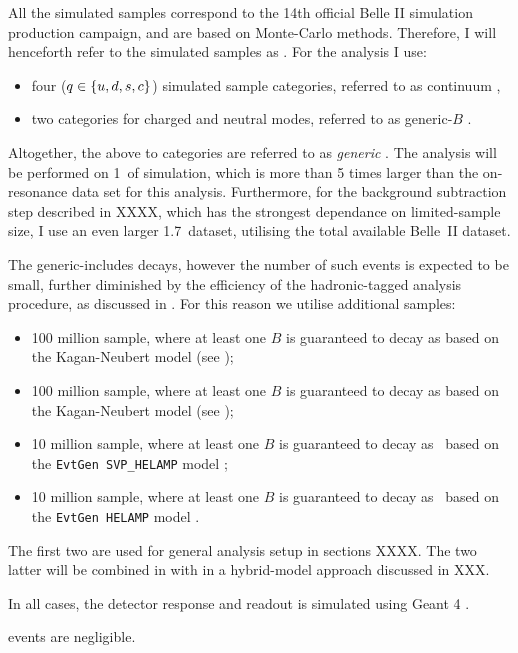 All the simulated samples correspond to the 14th official Belle II simulation production campaign, and are based on Monte-Carlo methods.
Therefore, I will henceforth refer to the simulated samples as \MC.
For the analysis I use:
\begin{itemize}
    \item four \epem\ra\qqbar ($q\in\{u,d,s,c\}$) simulated sample categories, referred to as continuum \MC,
    \item two \FourS\ra\BB categories for charged and neutral \B modes, referred to as generic-$B$ \MC.
\end{itemize}
Altogether, the above to categories are referred to as \textit{generic} \MC.
The analysis will be performed on 1~\invab of simulation, which is more than 5 times larger than the on-resonance data set for this analysis.
Furthermore, for the background subtraction step described in XXXX, which has the strongest dependance on limited-\MC sample size, I use an even larger 1.7~\invab dataset, utilising the total available Belle~II \MC dataset.

The generic-\B \MC includes \BtoXsgamma decays, however the number of such events is expected to be small, further diminished by the efficiency of the hadronic-tagged analysis procedure, as discussed in .
For this reason we utilise additional samples:
\begin{itemize}
    \item 100 million \BpBm sample, where at least one $B$ is guaranteed to decay as \BptoXsgamma based on the Kagan-Neubert model \cite{Kagan:1998ym} (see );
    \item 100 million \BzBzb sample, where at least one $B$ is guaranteed to decay as \BztoXsgamma based on the Kagan-Neubert model \cite{Kagan:1998ym} (see );
    \item 10 million \BpBm sample, where at least one $B$ is guaranteed to decay as \Bpm\ra\Kstarpm\gamma~based on the \texttt{EvtGen SVP\_HELAMP} model \cite{Ryd:2005zz};
    \item 10 million \BzBzb sample, where at least one $B$ is guaranteed to decay as \Bz\ra\Kstarz\gamma~based on the \texttt{EvtGen HELAMP} model \cite{Ryd:2005zz}.
\end{itemize}
The first two are used for general analysis setup in sections XXXX.
The two latter will be combined in with \BtoXsgamma in a hybrid-model approach \cite{Ramirez:1989yk} discussed in XXX.

In all cases, the detector response and readout is simulated using Geant 4 \cite{GEANT4:2002zbu}.

\epem\ra\tautau events are negligible.
